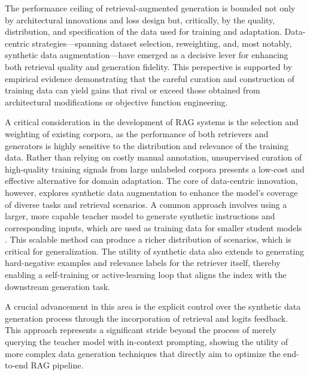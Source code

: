 \documentclass[11pt,a4paper]{article}
\begin{document}
The performance ceiling of retrieval-augmented generation is bounded not only by architectural innovations and loss design but, critically, by the quality, distribution, and specification of the data used for training and adaptation. Data-centric strategies---spanning dataset selection, reweighting, and, most notably, synthetic data augmentation---have emerged as a decisive lever for enhancing both retrieval quality and generation fidelity. This perspective is supported by empirical evidence demonstrating that the careful curation and construction of training data can yield gains that rival or exceed those obtained from architectural modifications or objective function engineering.

A critical consideration in the development of RAG systems is the selection and weighting of existing corpora, as the performance of both retrievers and generators is highly sensitive to the distribution and relevance of the training data. Rather than relying on costly manual annotation, unsupervised curation of high-quality training signals from large unlabeled corpora presents a low-cost and effective alternative for domain adaptation. The core of data-centric innovation, however, explores synthetic data augmentation to enhance the model's coverage of diverse tasks and retrieval scenarios. A common approach involves using a larger, more capable teacher model to generate synthetic instructions and corresponding inputs, which are used as training data for smaller student models \cite{arxiv:2401.15422v2}. This scalable method can produce a richer distribution of scenarios, which is critical for generalization. The utility of synthetic data also extends to generating hard-negative examples and relevance labels for the retriever itself, thereby enabling a self-training or active-learning loop that aligns the index with the downstream generation task.

A crucial advancement in this area is the explicit control over the synthetic data generation process through the incorporation of retrieval and logits feedback. This approach represents a significant stride beyond the process of merely querying the teacher model with in-context prompting, showing the utility of more complex data generation techniques that directly aim to optimize the end-to-end RAG pipeline.
\end{document}
